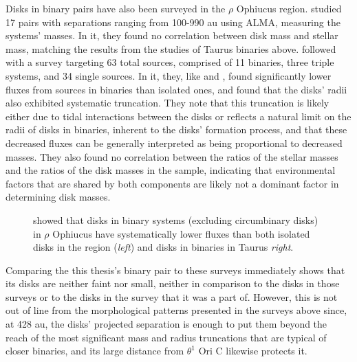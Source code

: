 Disks in binary pairs have also been surveyed in the $\rho$ Ophiucus region. \citet{Akeson2014} studied 17 pairs with separations ranging from 100-990 au using ALMA, measuring the systems' masses. In it, they found no correlation between disk mass and stellar mass, matching the results from the studies of Taurus binaries above. \citet{Cox2017} followed with a survey targeting 63 total sources, comprised of 11 binaries, three triple systems, and 34 single sources. In it, they, like \citet{Harris2012} and \citet{Akeson2019}, found significantly lower fluxes from sources in binaries than isolated ones, and found that the disks' radii also exhibited systematic truncation. They note that this truncation is likely either due to tidal interactions between the disks or reflects a natural limit on the radii of disks in binaries, inherent to the disks' formation process, and that these decreased fluxes can be generally interpreted as being proportional to decreased masses. They also found no correlation between the ratios of the stellar masses and the ratios of the disk masses in the sample, indicating that environmental factors that are shared by both components are likely not a dominant factor in determining disk masses.


 \begin{figure}[h]
   \hspace*{\fill}%
   \hspace*{\fill}%
   \caption{\citet{Cox2017} showed that disks in binary systems (excluding circumbinary disks) in $\rho$ Ophiucus have systematically lower fluxes than both isolated disks in the region (\textit{left}) and disks in binaries in Taurus \textit{right}.}
   \label{fig:rhoOph_binaries}
 \end{figure}


Comparing the this thesis's binary pair to these surveys immediately shows that its disks are neither faint nor small, neither in comparison to the disks in those surveys or to the disks in the survey that it was a part of. However, this is not out of line from the morphological patterns presented in the surveys above since, at 428 au, the disks' projected separation is enough to put them beyond the reach of the most significant mass and radius truncations that are typical of closer binaries, and its large distance from $\theta^1$ Ori C likewise protects it.






